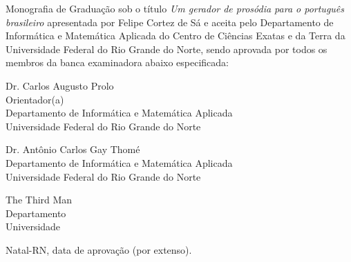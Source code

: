\begin{folhadeaprovacao}
	\setlength{\ABNTsignthickness}{0.4pt}
	\setlength{\ABNTsignwidth}{10cm}
	
	\noindent 
	Monografia de Graduação sob o título \textit{Um gerador de prosódia para o português brasileiro} apresentada por 
	Felipe Cortez de Sá e aceita pelo Departamento de Informática e Matemática Aplicada do
	Centro de Ciências Exatas e da Terra da Universidade Federal do Rio Grande do Norte,
	sendo aprovada por todos os membros da banca examinadora abaixo especificada:
		
	\assinatura
	{
		Dr. Carlos Augusto Prolo\\
		{\small Orientador(a)} \\ 
		{\footnotesize
            Departamento de Informática e Matemática Aplicada\\
		  	Universidade Federal do Rio Grande do Norte
		}
	}
	
		
	\assinatura
	{
        Dr. Antônio Carlos Gay Thomé\\ 
		{\footnotesize
            Departamento de Informática e Matemática Aplicada\\
		  	Universidade Federal do Rio Grande do Norte
		}
	}
		
	\assinatura
	{
		The Third Man\\ 
		{\footnotesize
			Departamento\\
		  	Universidade
		}
	}
		
	\vfill
	
	\begin{center}
		Natal-RN, data de aprovação (por extenso).
	\end{center}
\end{folhadeaprovacao}
